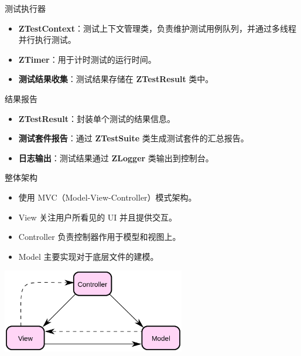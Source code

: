 \documentclass{beamer}
\begin{document}
\begin{frame}{测试执行器}
    \begin{itemize}
        \item \textbf{ZTestContext}：测试上下文管理类，负责维护测试用例队列，并通过多线程并行执行测试。
        \item \textbf{ZTimer}：用于计时测试的运行时间。
        \item \textbf{测试结果收集}：测试结果存储在 \textbf{ZTestResult} 类中。
    \end{itemize}
\end{frame}

\begin{frame}{结果报告}
    \begin{itemize}
        \item \textbf{ZTestResult}：封装单个测试的结果信息。
        \item \textbf{测试套件报告}：通过 \textbf{ZTestSuite} 类生成测试套件的汇总报告。
        \item \textbf{日志输出}：测试结果通过 \textbf{ZLogger} 类输出到控制台。
    \end{itemize}
\end{frame}

\begin{frame}{整体架构}
    \begin{itemize}
        \item 使用 MVC（Model-View-Controller）模式架构。
        \item View 关注用户所看见的 UI 并且提供交互。
        \item Controller 负责控制器作用于模型和视图上。
        \item Model 主要实现对于底层文件的建模。
    \end{itemize}
    \centering
    \includegraphics[width=0.6\textwidth]{img/mvc.png}
\end{frame}
\end{document}
